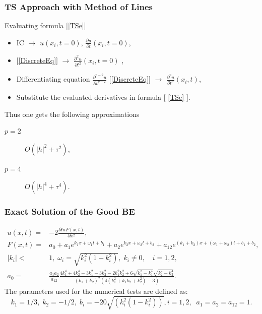 \documentclass{beamer}
\newcommand{\be}{\begin{equation}}
\newcommand{\ee}{\end{equation}}
\begin{document}

\begin{frame}
\frametitle{TS Approach with Method of Lines}
Evaluating formula [\ref{TSe}]
\begin{itemize}
 \item IC $\rightarrow$ $u(x_i, t=0)$, $\frac{ \partial u }{ \partial t }(x_i,  t=0)$,
 \item $[$\ref{DiscreteEq}$]$ $\rightarrow$ $\frac{ \partial^2 u }{ \partial t^2 }(x_i, t=0)$ ,
 \item Differentiating equation $\frac{ \partial^{p-2} u }{ \partial t^{p-2} }$ [\ref{DiscreteEq}] $\rightarrow$  $\frac{ \partial^p u }{ \partial t^p }(x_i, t)$,
 \item Substitute the evaluated derivatives in formula $[$ \ref{TSe} $]$.
\end{itemize}


Thus one gets the following approximations
\begin{description}
 \item[$p=2$] $O(|h|^2 + \tau^2)$,
 \item[$p=4$] $O(|h|^4 + \tau^4)$.
\end{description}
\end{frame}

\begin{frame}
\frametitle{Exact Solution of the Good BE}
\begin{align}\label{orgBsqSol}
u(x,t) =& -2 \frac{\partial ln F(x,t)}{\partial x^2},
\\
 F(x,t) =& a_0 + a_1 e^{k_1 x + \omega_1 t + b_1} + a_2 e^{k_2 x + \omega_2 t + b_2}  + a_{12} e^{(k_1 + k_2) x + (\omega_1 + \omega_2)  t + b_1 + b_2}, \nonumber
\\
|k_i| <& 1, \; \omega_i = \sqrt{k^2_i(1-k^2_i) }, \; k_i \neq 0, \quad i = 1,2, \nonumber
\\
a_0 =& \frac{a_1 a_2}{a_{12}}\frac{4k_1^4 + 4k_2^4 - 3k_1^2 - 3k_2^2 - 2k_1^2 k_2^2 + 6\sqrt{k_1^2-k_1^4}\sqrt{k_2^2-k_2^4} }{(k_1 + k_2)^2 (4(k_1^2 + k_1 k_2 + k_2^2) - 3)}.\nonumber
\end{align}
The parameters used for the numerical tests are defined as:
\be\label{params}
        k_1 = 1/3,  \; k_2 = -1/2,  \; b_i = -20\sqrt{(k_i^ 2  (1 - k_i ^ 2))}, i=1,2,  \;\; a_1 = a_2 = a_{12} = 1.
\ee

\end{frame}
\end{document}
